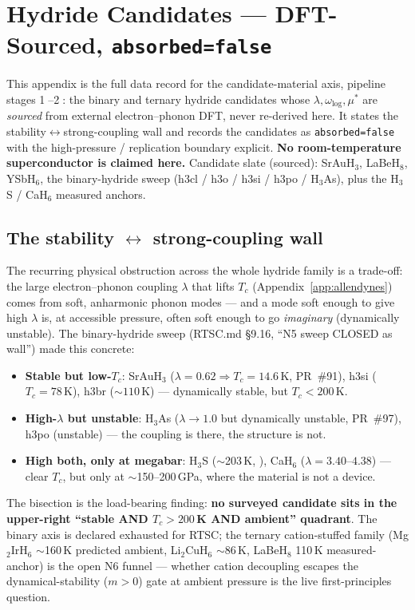 \section{Hydride Candidates --- DFT-Sourced, \texttt{absorbed=false}}
\label{app:hydride}

This appendix is the full data record for the candidate-material axis,
pipeline stages \textcircled{\scriptsize 1}--\textcircled{\scriptsize 2}:
the binary and ternary hydride candidates whose
$\lambda,\omega_{\log},\mu^{*}$ are \emph{sourced} from external
electron--phonon DFT, never re-derived here. It states the
stability$\leftrightarrow$strong-coupling wall and records the candidates
as \texttt{absorbed=false} with the high-pressure / replication boundary
explicit. \textbf{No room-temperature superconductor is claimed here.}
Candidate slate (sourced): SrAuH$_3$, LaBeH$_8$, YSbH$_6$, the
binary-hydride sweep (h3cl / h3o / h3si / h3po / H$_3$As), plus the
H$_3$S / CaH$_6$ measured anchors.

\subsection{The stability $\leftrightarrow$ strong-coupling wall}
\label{app:hyd-wall}

The recurring physical obstruction across the whole hydride family is a
trade-off: the large electron--phonon coupling $\lambda$ that lifts $T_c$
(Appendix~\ref{app:allendynes}) comes from soft, anharmonic phonon modes
--- and a mode soft enough to give high $\lambda$ is, at accessible
pressure, often soft enough to go \emph{imaginary} (dynamically unstable).
The binary-hydride sweep (RTSC.md \S9.16, ``N5 sweep CLOSED as wall'') made
this concrete:
\begin{itemize}\itemsep0.2em
\item \textbf{Stable but low-$T_c$}: SrAuH$_3$ ($\lambda\!=\!0.62
  \Rightarrow T_c\!=\!14.6$\,K, PR~\#91), h3si ($T_c\!=\!78$\,K),
  h3br ($\sim\!110$\,K) --- dynamically stable, but $T_c\!<\!200$\,K.
\item \textbf{High-$\lambda$ but unstable}: H$_3$As ($\lambda\!\to\!1.0$
  but dynamically unstable, PR~\#97), h3po (unstable) --- the coupling is
  there, the structure is not.
\item \textbf{High both, only at megabar}: H$_3$S ($\sim$203\,K,
  \citep{drozdov2015}), CaH$_6$ ($\lambda\!=\!3.40$--$4.38$) --- clear
  $T_c$, but only at $\sim$150--200\,GPa, where the material is not a
  device.
\end{itemize}
The bisection is the load-bearing finding: \textbf{no surveyed candidate
sits in the upper-right ``stable AND $T_c\!>\!200$\,K AND ambient''
quadrant}. The binary axis is declared exhausted for RTSC; the ternary
cation-stuffed family (Mg$_2$IrH$_6$ $\sim$160\,K predicted ambient,
Li$_2$CuH$_6$ $\sim$86\,K, LaBeH$_8$ 110\,K measured-anchor) is the open
N6 funnel --- whether cation decoupling escapes the dynamical-stability
($m\!>\!0$) gate at ambient pressure is the live first-principles question.

